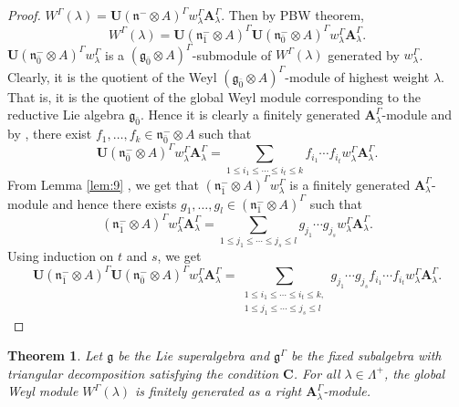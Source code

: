 \documentclass[11pt]{amsart}
\theoremstyle{plain}
\newtheorem{thm}{Theorem}[section]
\theoremstyle{definition}
\newcommand{\g}{\mathfrak{g}}
\newcommand{\n}{\mathfrak{n}}
\newcommand{\A}{\mathbf{A}_{\lambda}^{\Gamma}}
\newcommand{\w}{w_{\lambda}^{\Gamma}}
\begin{document}
 \begin{proof}
$W^{\Gamma}(\lambda)=\mathbf{U}(\n^{-}\otimes A)^{\Gamma}\w\A$. Then by PBW theorem,
     \begin{equation*}
         W^{\Gamma}(\lambda)=\mathbf{U}(\n^{-}_{\bar{1}}\otimes A)^{\Gamma}\mathbf{U}(\n^{-}_{\bar{0}}\otimes A)^{\Gamma}\w\A.
     \end{equation*}
    $\mathbf{U}(\n_{\bar{0}}^{-}\otimes A)^{\Gamma}\w$ is a $(\g_{\bar{0}}\otimes A)^{\Gamma}$-submodule of $W^{\Gamma}(\lambda)$ generated by $\w$. Clearly, it is the quotient of the Weyl $(\g_{\bar{0}}\otimes A)^{\Gamma}$-module of highest weight $\lambda$. That is, it is the quotient of the global Weyl module corresponding to the reductive Lie algebra $\g_{\bar{0}}$. Hence it is clearly a finitely generated $\A$-module and by \cite[Theorem 5.10 ]{FMS15}, there exist $f_{1},\ldots,f_{k}\in\n_{\bar{0}}^{-}\otimes A$ such that 
    \begin{equation*}
        \mathbf{U}(\n_{\bar{0}}^{-}\otimes A)^{\Gamma}\w\A=\sum_{1\leq i_{1}\leq\cdots\leq i_{t}\leq k}f_{i_{1}}\cdots f_{i_{t}}\w\A.
    \end{equation*}
From Lemma \ref{lem:9} , we get that $(\n_{\bar{1}}^{-}\otimes A)^{\Gamma}\w$ is a finitely generated $\A$-module and hence there exists $g_{1},\ldots,g_{l}\in(\n_{\bar{1}}^{-}\otimes A)^{\Gamma}$ such that 
\begin{equation*}
(\n^{-}_{\bar{1}}\otimes A)^{\Gamma}\w\A=\sum_{1\leq j_{1}\leq\cdots\leq j_{s}\leq l}g_{j_{1}}\cdots g_{j_s}\w\A.
\end{equation*}
Using induction on $t$ and $s$, we get 
    \begin{equation*}
        \mathbf{U}(\n_{\bar{1}}^{-}\otimes A)^{\Gamma}\mathbf{U}(\n^{-}_{\bar{0}}\otimes A)^{\Gamma}\w\A= \sum_{\substack{1\leq i_{1}\leq\cdots\leq i_{t}\leq k,\\ 1\leq j_{1}\leq\cdots\leq j_{s}\leq l}}
        g_{j_{1}}\cdots g_{j_s}f_{i_{1}}\cdots f_{i_{t}}\w\A.
    \end{equation*}
 \end{proof}
\begin{thm}\label{thm:1}
Let $\g$ be the Lie superalgebra and $\g^{\Gamma}$ be the fixed subalgebra with triangular decomposition satisfying the condition $\mathbf{C}$. For all $\lambda\in \Lambda^{+}$, the global Weyl module $W^{\Gamma}(\lambda)$ is finitely generated as a right $\A$-module.
\end{thm}
\end{document}
